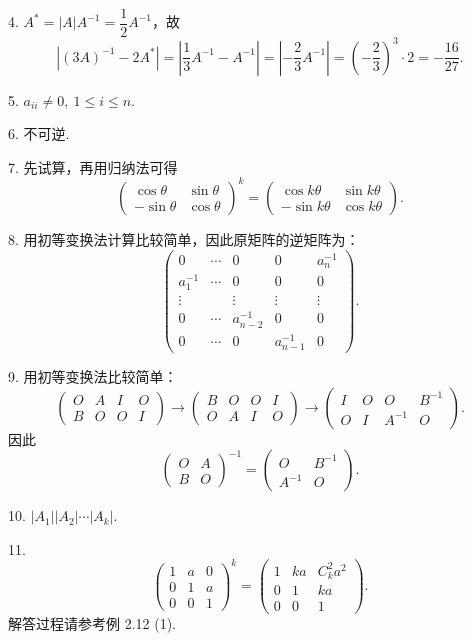 \documentclass[UTF8,12pt,a4paper,fontset=fandol]{ctexart}
\begin{document}
4. $A^*=|A|A^{-1}=\dfrac12A^{-1}$，故
\[
|(3A)^{-1}-2A^*|
=\left|\frac13A^{-1}-A^{-1}\right|
=\left|-\frac23A^{-1}\right|
=\left(-\frac23\right)^3\cdot2
=-\frac{16}{27}.
\]

5. $a_{ii}\ne0,\ 1\le i\le n$.

6. 不可逆.

7. 先试算，再用归纳法可得
\[
\left(
\begin{array}{cc}
\cos\theta & \sin\theta\\
-\sin\theta & \cos\theta
\end{array}
\right)^k
=
\left(
\begin{array}{cc}
\cos k\theta & \sin k\theta\\
-\sin k\theta & \cos k\theta
\end{array}
\right).
\]

8. 用初等变换法计算比较简单，因此原矩阵的逆矩阵为：
\[
\left(
\begin{array}{ccccc}
0 & \cdots & 0 & 0 & a_n^{-1}\\
a_1^{-1} & \cdots & 0 & 0 & 0\\
\vdots & & \vdots & \vdots & \vdots\\
0 & \cdots & a_{n-2}^{-1} & 0 & 0\\
0 & \cdots & 0 & a_{n-1}^{-1} & 0
\end{array}
\right).
\]

9. 用初等变换法比较简单：
\[
\left(
\begin{array}{cc|cc}
O & A & I & O\\
B & O & O & I
\end{array}
\right)
\to
\left(
\begin{array}{cc|cc}
B & O & O & I\\
O & A & I & O
\end{array}
\right)
\to
\left(
\begin{array}{cc|cc}
I & O & O & B^{-1}\\
O & I & A^{-1} & O
\end{array}
\right).
\]
因此
\[
\left(
\begin{array}{cc}
O & A\\
B & O
\end{array}
\right)^{-1}
=
\left(
\begin{array}{cc}
O & B^{-1}\\
A^{-1} & O
\end{array}
\right).
\]

10. $|A_1||A_2|\cdots|A_k|$.

11.
\[
\left(
\begin{array}{ccc}
1 & a & 0\\
0 & 1 & a\\
0 & 0 & 1
\end{array}
\right)^k
=
\left(
\begin{array}{ccc}
1 & ka & C_k^2a^2\\
0 & 1 & ka\\
0 & 0 & 1
\end{array}
\right).
\]
解答过程请参考例 2.12 (1).
\end{document}
